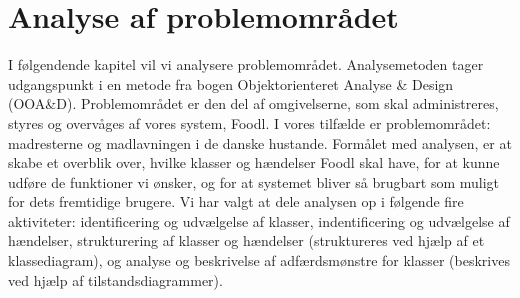 \chapter{Analyse af problemområdet}
\label{chap:analyseafpo}

I følgendende kapitel vil vi analysere problemområdet. Analysemetoden tager udgangspunkt i en metode fra bogen Objektorienteret Analyse \& Design (OOA\&D)\cite[s. ~43]{ooad}. Problemområdet er den del af omgivelserne, som skal administreres, styres og overvåges af vores system, Foodl. I vores tilfælde er problemområdet: madresterne og madlavningen i de danske hustande. Formålet med analysen, er at skabe et overblik over, hvilke klasser og hændelser Foodl skal have, for at kunne udføre de funktioner vi ønsker, og for at systemet bliver så brugbart som muligt for dets fremtidige brugere. Vi har valgt at dele analysen op i følgende fire aktiviteter: identificering og udvælgelse af klasser, indentificering og udvælgelse af hændelser, strukturering af klasser og hændelser (struktureres ved hjælp af et klassediagram), og analyse og beskrivelse af adfærdsmønstre for klasser (beskrives ved hjælp af tilstandsdiagrammer).  

 
            
 
       

